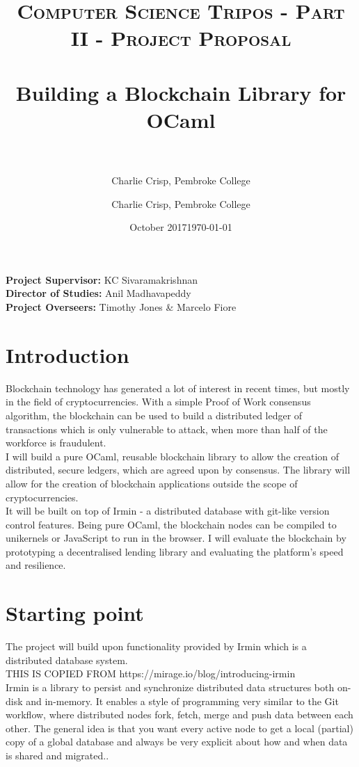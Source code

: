 \documentclass[12pt, letterpaper, twoside]{article}
\author{Charlie Crisp, Pembroke College }
\date{October 2017}
\title{	
	\normalfont \normalsize 
	\textsc{Computer Science Tripos - Part II - Project Proposal} \\ [25pt]
	\horrule{0.5pt} \\[0.4cm] %
	\huge Building a Blockchain Library for OCaml\\ %
	\horrule{2pt} \\[0.5cm] %
}
\author{Charlie Crisp, Pembroke College }
\date{\normalsize\today} %
\begin{document}
	
	\maketitle
	
	\noindent \textbf{Project Supervisor:} KC Sivaramakrishnan \\
	\textbf{Director of Studies:} Anil Madhavapeddy \\
	\textbf{Project Overseers:} Timothy Jones \& Marcelo Fiore\\
	
	\section{Introduction}
	
	Blockchain technology has generated a lot of interest in recent times, but mostly in the field of cryptocurrencies.
	With a simple Proof of Work consensus algorithm, the blockchain can be used to build a distributed ledger of transactions which is only vulnerable to attack, when more than half of the workforce is fraudulent. \\
	I will build a pure OCaml, reusable blockchain library to allow the creation of distributed, secure ledgers, which are agreed upon by consensus. The library will allow for the creation of blockchain applications outside the scope of cryptocurrencies. \\
	It will be built on top of Irmin \cite{Irmin} - a distributed database with git-like version control features. Being pure OCaml, the blockchain nodes can be compiled to unikernels or JavaScript to run in the browser. I will evaluate the blockchain by prototyping a decentralised lending library and evaluating the platform’s speed and resilience.
	\section{Starting point}
	The project will build upon functionality provided by Irmin \cite{Irmin} which is a distributed database system. \\
	THIS IS COPIED FROM https://mirage.io/blog/introducing-irmin\\
	Irmin is a library to persist and synchronize distributed data structures both on-disk and in-memory. It enables a style of programming very similar to the Git workflow, where distributed nodes fork, fetch, merge and push data between each other. The general idea is that you want every active node to get a local (partial) copy of a global database and always be very explicit about how and when data is shared and migrated..
\end{document}
